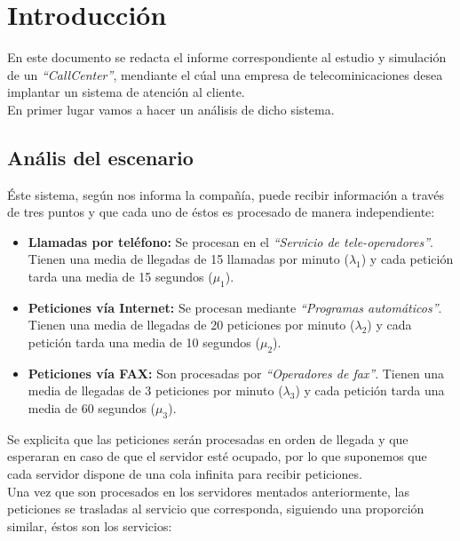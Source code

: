 \section{Introducción}

En este documento se redacta el informe correspondiente al estudio y simulación de un \emph{``CallCenter''}, mendiante el cúal una empresa de telecominicaciones desea implantar un sistema de atención al cliente.\\

En primer lugar vamos a hacer un análisis de dicho sistema.

\subsection{Anális del escenario}
Éste sistema, según nos informa la compañía, puede recibir información a través de tres puntos y que cada uno de éstos es procesado de manera independiente:

\begin{itemize}
  \item \textbf{Llamadas por teléfono:} Se procesan en el \emph{``Servicio de tele-operadores''}. Tienen una media de llegadas de 15 llamadas por minuto ($\lambda_{1}$) y cada petición tarda una media de 15 segundos ($\mu_{1}$).
  \item \textbf{Peticiones vía Internet:} Se procesan mediante \emph{``Programas automáticos''}. Tienen una media de llegadas de 20 peticiones por minuto ($\lambda_{2}$) y cada petición tarda una media de 10 segundos ($\mu_{2}$).
  \item \textbf{Peticiones vía FAX:} Son procesadas por \emph{``Operadores de fax''}. Tienen una media de llegadas de 3 peticiones por minuto ($\lambda_{3}$) y cada petición tarda una media de 60 segundos ($\mu_{3}$).
\end{itemize}

Se explicita que las peticiones serán procesadas en orden de llegada y que esperaran en caso de que el servidor esté ocupado, por lo que suponemos que cada servidor dispone de una cola infinita para recibir peticiones.\\

Una vez que son procesados en los servidores mentados anteriormente, las peticiones se trasladas al servicio que corresponda, siguiendo una proporción similar, éstos son los servicios:


